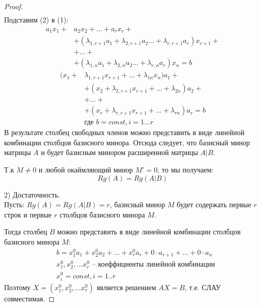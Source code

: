 \begin{proof}
\begin{gather*}
  \end{gather*}
  Подставим (2) в (1):
  \begin{align*}
    a_1 x_1 + &a_2 x_2 + \ldots + a_r x_r + \\
            &+ (\lambda_{1,r+1} a_1 + \lambda_{2,r+1} a_2 \ldots + \lambda_{r,r+1} a_r) x_{r+1} + \\
            &+ \ldots + \\
            &+ (\lambda_{1,n} a_1 + \lambda_{2,n} a_2 \ldots + \lambda_{r,n} a_r) x_{n} = b
  \end{align*}
  \begin{align*}
    (x_1 + &\lambda_{1,r+1} x_{r+1} + \ldots + \lambda_{1n} x_{n}) a_1 + \\
          &+ (x_2 + \lambda_{2,r+1} x_{r+1} + \ldots + \lambda_{2n}) a_2 + \\
          &+ \ldots + \\
          &+ (x_r + \lambda_{r,r+1} x_{r+1} + \ldots + \lambda_{rn}) a_r = b \\
          &\text{где } b = const, i=1 \ldots r
  \end{align*}
  В результате столбец свободных членов можно представить в виде линейной комбинации столбцов базисного минора. Отсюда следует, что базисный минор матрицы $A$ и будет базисным минором расширенной матрицы $A|B$.
  
  Т.к $M \neq 0$ и любой окаймляющий минор $M' = 0$, то мы получаем: \[
  Rg(A) = Rg(A|B)
  \] 

  2) Достаточность. \\
  Пусть: $Rg(A) = Rg(A|B) = r$, базисный минор $M$ будет содержать первые $r$ строк и первые  $r$ столбцов базисного минора $M$.
  
  Тогда столбец  $B$ можно представить в виде линейной комбинации столбцов базисного минора $M$:
  \begin{align*}
    &b = x_1^0 a_1 + x_2^0 a_2 + \ldots + x_r^0 a_r + 0 \cdot a_{r+1} + \ldots + 0 \cdot a_n \\
    &x_1^0, x_2^0, \ldots x_r^0 \text{ -- коеффициенты линейной комбинации} \\
    &x_i^0 = const, i=1..r
  \end{align*}
  Поэтому $X = \left( x_1^0, x_2^0, \ldots x_r^0 \right) $ является решением $AX=B$, т.е. СЛАУ совместимая.
\end{proof}

